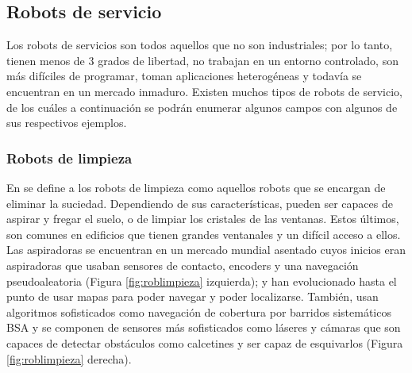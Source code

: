 \setcounter{footnote}{3} %


\subsection{Robots de servicio}

Los robots de servicios son todos aquellos que no son industriales; por lo tanto, tienen menos de 3 grados de libertad, no trabajan en un entorno controlado, son más difíciles de programar, toman aplicaciones heterogéneas y todavía se encuentran en un mercado inmaduro. Existen muchos tipos de robots de servicio, de los cuáles a continuación se podrán enumerar algunos campos con algunos de sus respectivos ejemplos. \\ 


\subsubsection{Robots de limpieza}

En \cite{plaza_robotica_servicio} se define a los robots de limpieza como aquellos robots que se encargan de eliminar la suciedad. Dependiendo de sus características, pueden ser capaces de aspirar y fregar el suelo, o de limpiar los cristales de las ventanas. Estos últimos, son comunes en edificios que tienen grandes ventanales y un difícil acceso a ellos. Las aspiradoras se encuentran en un mercado mundial asentado cuyos inicios eran aspiradoras que usaban sensores de contacto, encoders y una navegación pseudoaleatoria (Figura \ref{fig:roblimpieza} izquierda); y han evolucionado hasta el punto de usar mapas para poder navegar y poder localizarse. También, usan algoritmos sofisticados como navegación de cobertura por barridos sistemáticos \acs{BSA} y se componen de sensores más sofisticados como láseres y cámaras que son capaces de detectar obstáculos como calcetines y ser capaz de esquivarlos (Figura \ref{fig:roblimpieza} derecha).\\


